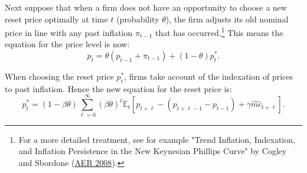 \documentclass[dvipsnames,11pt]{article}
\begin{document}
    \noindent Next suppose that when a firm does not have an opportunity to choose a new reset price optimally at time $t$ (probability $\theta$), the firm adjusts its old nominal price in line with any past inflation $\pi_{t-1}$ that has occurred.\footnote{For a more detailed treatment, see for example "Trend Inflation, Indexation, and Inflation Persistence in the New Keynesian Phillips Curve" by Cogley and Sbordone (\href{https://www.aeaweb.org/articles?id=10.1257/aer.98.5.2101}{AER 2008}).} This means the equation for the price level is now:
    \[
    p_t = \theta (p_{t-1} + \pi_{t-1}) + (1 - \theta) p^*_t.
    \]
    
    \noindent When choosing the reset price $p^*_t$, firms take account of the indexation of prices to past inflation. Hence the new equation for the reset price is:
    \[
    p^*_t = (1 - \beta \theta) \sum_{\ell=0}^\infty (\beta \theta)^\ell \mathbb{E}_t [p_{t+\ell} - (p_{t+\ell-1} - p_{t-1}) +  \gamma \widehat{mc}_{t+\ell}].
    \]
\end{document}
